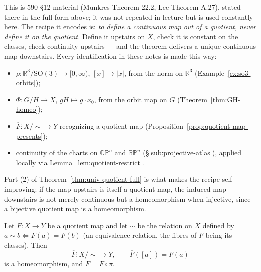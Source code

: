 \documentclass[11pt]{report}
\makeatletter
\newcounter{thmcounter}[section]
\newcommand{\thmlabel}[1]{\edef\@currentlabel{\arabic{section}.\arabic{thmcounter}}\label{#1}}
\newcommand{\SO}{\mathrm{SO}}
\newcommand{\leeref}[1]{\par\smallskip{\raggedleft\footnotesize\textsc{Lee}:\ #1\par}}
\makeatother
\begin{document}
\begin{rembox}\label{rem:how-this-gets-used}
This is 590 \S12 material (Munkres Theorem 22.2, Lee Theorem A.27), stated there in the full form above; it was not repeated in lecture but is used constantly here. The recipe it encodes is: \emph{to define a continuous map out of a quotient, never define it on the quotient.} Define it upstairs on $X$, check it is constant on the classes, check continuity upstairs --- and the theorem delivers a unique continuous map downstairs. Every identification in these notes is made this way:
\begin{itemize}
    \item $\rho : \mathbb{R}^3/\SO(3) \to [0,\infty)$, $[x] \mapsto |x|$, from the norm on $\mathbb{R}^3$ (Example~\ref{ex:so3-orbits});
    \item $\Phi : G/H \to X$, $gH \mapsto g \cdot x_0$, from the orbit map on $G$ (Theorem~\ref{thm:GH-homeo});
    \item $\overline{F} : X/{\sim} \to Y$ recognizing a quotient map (Proposition~\ref{prop:quotient-map-presents});
    \item continuity of the charts on $\mathbb{CP}^n$ and $\mathbb{RP}^n$ (\S\ref{sub:projective-atlas}), applied locally via Lemma~\ref{lem:quotient-restrict}.
\end{itemize}
Part (2) of Theorem~\ref{thm:univ-quotient-full} is what makes the recipe self-improving: if the map upstairs is itself a quotient map, the induced map downstairs is not merely continuous but a homeomorphism when injective, since a bijective quotient map is a homeomorphism.
\end{rembox}

\begin{propbox}\thmlabel{prop:quotient-map-presents}
Let $F : X \to Y$ be a quotient map and let $\sim$ be the relation on $X$ defined by $a \sim b \iff F(a) = F(b)$ (an equivalence relation, the fibres of $F$ being its classes). Then
\[
\overline{F} : X/{\sim} \longrightarrow Y, \qquad \overline{F}([a]) = F(a)
\]
is a homeomorphism, and $F = \overline{F} \circ \pi$.
\leeref{Theorem A.31}
\end{propbox}
\end{document}
